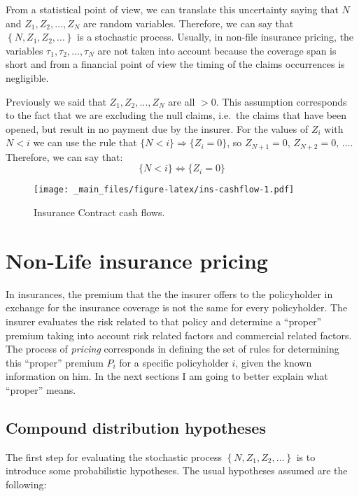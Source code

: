 \documentclass[a4paper, nobind]{templates/ociamthesis}
\theoremstyle{definition}
\theoremstyle{definition}
\theoremstyle{definition}
\theoremstyle{remark}
\begin{document}
From a statistical point of view, we can translate this uncertainty saying that \(N\) and \(Z_1, Z_2, \dots, Z_N\) are random variables. Therefore, we can say that \(\left\{N, Z_1, Z_2, \dots \right\}\) is a stochastic process. Usually, in non-file insurance pricing, the variables \(\tau_1, \tau_2, \dots, \tau_N\) are not taken into account because the coverage span is short and from a financial point of view the timing of the claims occurrences is negligible.

Previously we said that \(Z_1, Z_2, \dots, Z_N\) are all \(>0\). This assumption corresponds to the fact that we are excluding the null claims, i.e.~the claims that have been opened, but result in no payment due by the insurer. For the values of \(Z_i\) with \(N<i\) we can use the rule that \(\{N<i\} \Rightarrow \{Z_i = 0\}\), so \(Z_{N+1}=0, \, Z_{N+2}=0, \, \dots\). Therefore, we can say that:
\[
\{N<i \} \Longleftrightarrow \{Z_i = 0\}
\]

\begin{figure}
\centering
\texttt{[image: \_main\_files/figure-latex/ins-cashflow-1.pdf]}
\caption{\label{fig:ins-cashflow}Insurance Contract cash flows.}
\end{figure}

\hypertarget{non-life-insurance-pricing}{%
\section{Non-Life insurance pricing}\label{non-life-insurance-pricing}}

In insurances, the premium that the the insurer offers to the policyholder in exchange for the insurance coverage is not the same for every policyholder. The insurer evaluates the risk related to that policy and determine a ``proper'' premium taking into account risk related factors and commercial related factors. The process of \emph{pricing} corresponds in defining the set of rules for determining this ``proper'' premium \(P_i\) for a specific policyholder \(i\), given the known information on him. In the next sections I am going to better explain what ``proper'' means.

\hypertarget{compound-distribution-hypotheses}{%
\subsection{Compound distribution hypotheses}\label{compound-distribution-hypotheses}}

The first step for evaluating the stochastic process \(\left\{N, Z_1, Z_2, \dots \right\}\) is to introduce some probabilistic hypotheses. The usual hypotheses assumed are the following:
\end{document}
